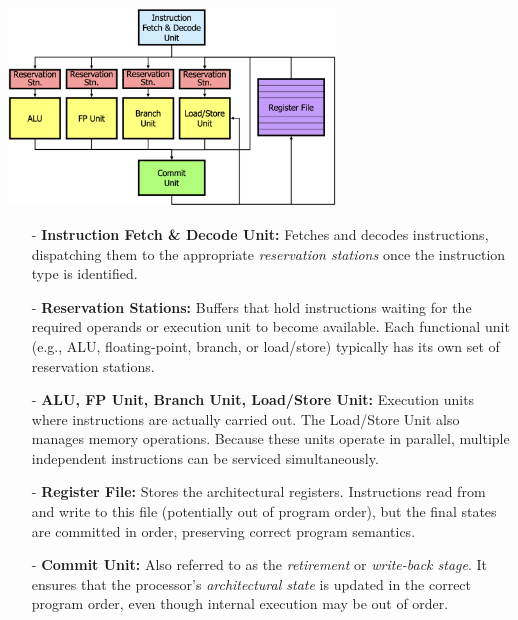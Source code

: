 \begin{center}
    \includegraphics[width=0.65\textwidth]{chapters/chapter4d/images/complete.png}
\end{center}
\begin{itemize}
  \item[-] \textbf{Instruction Fetch \& Decode Unit:}
    Fetches and decodes instructions, dispatching them to the appropriate
    \emph{reservation stations} once the instruction type is identified.

  \item[-] \textbf{Reservation Stations:}
    Buffers that hold instructions waiting for the required operands or
    execution unit to become available. Each functional unit (e.g., ALU,
    floating-point, branch, or load/store) typically has its own set of
    reservation stations.

  \item[-] \textbf{ALU, FP Unit, Branch Unit, Load/Store Unit:}
    Execution units where instructions are actually carried out. The Load/Store
    Unit also manages memory operations. Because these units operate in parallel,
    multiple independent instructions can be serviced simultaneously.

  \item[-] \textbf{Register File:}
    Stores the architectural registers. Instructions read from and write to
    this file (potentially out of program order), but the final states are
    committed in order, preserving correct program semantics.

  \item[-] \textbf{Commit Unit:}
    Also referred to as the \emph{retirement} or \emph{write-back stage}. It
    ensures that the processor's \emph{architectural state} is updated in the
    correct program order, even though internal execution may be out of order.
\end{itemize}

